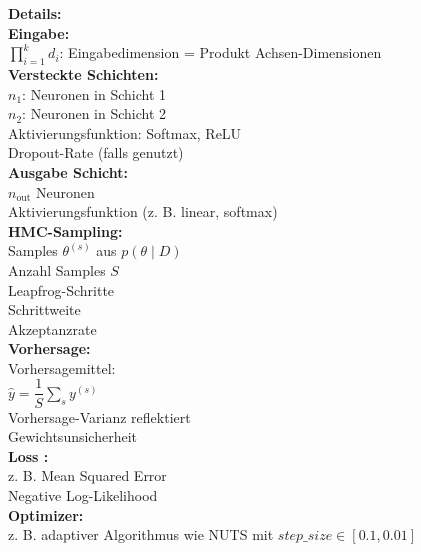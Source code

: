 \begin{center}
\begin{minipage}[t]{0.47\textwidth}
{
}
\end{minipage}%
\hfill
\begin{minipage}[t]{0.48\textwidth}
\raggedright
\small
\textbf{Details:} \\[6pt]

\textbf{Eingabe:} \\
$\prod_{i=1}^k d_i$: Eingabedimension = Produkt Achsen-Dimensionen
\\[4pt]

\textbf{Versteckte Schichten:} \\
$n_1$: Neuronen in Schicht 1 \\
$n_2$: Neuronen in Schicht 2 \\
Aktivierungsfunktion: Softmax, ReLU \\
Dropout-Rate (falls genutzt) \\[4pt]

\textbf{Ausgabe Schicht:} \\
$n_\text{out}$ Neuronen \\
Aktivierungsfunktion (z. B. linear, softmax) \\[4pt]

\textbf{HMC-Sampling:} \\
Samples $\theta^{(s)}$ aus $p(\theta \mid D)$ \\
Anzahl Samples $S$ \\
Leapfrog-Schritte \\
Schrittweite \\
Akzeptanzrate \\[4pt]

\textbf{Vorhersage:} \\
Vorhersagemittel: \\
$\hat{y} = \dfrac{1}{S} \sum_{s} y^{(s)}$ \\
Vorhersage-Varianz reflektiert \\
Gewichtsunsicherheit \\[4pt]

\textbf{\glqq Loss \grqq:} \\
z. B. Mean Squared Error \\ 
Negative Log-Likelihood \\[4pt]

\textbf{Optimizer:} \\
z. B. adaptiver Algorithmus wie NUTS mit $step\_size \in [0.1, 0.01]$
\end{minipage}
\end{center}
